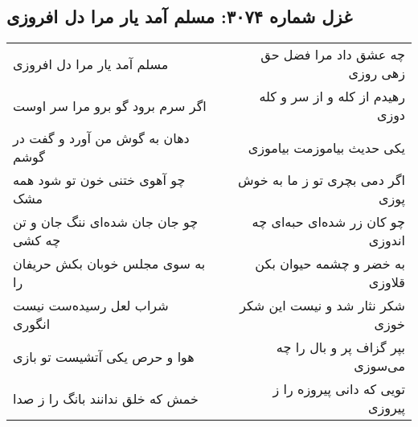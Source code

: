 \begin{center}
\section*{غزل شماره ۳۰۷۴: مسلم آمد یار مرا دل افروزی}
\label{sec:3074}
\begin{longtable}{l p{0.5cm} r}
مسلم آمد یار مرا دل افروزی
&&
چه عشق داد مرا فضل حق زهی روزی
\\
اگر سرم برود گو برو مرا سر اوست
&&
رهیدم از کله و از سر و کله دوزی
\\
دهان به گوش من آورد و گفت در گوشم
&&
یکی حدیث بیاموزمت بیاموزی
\\
چو آهوی ختنی خون تو شود همه مشک
&&
اگر دمی بچری تو ز ما به خوش پوزی
\\
چو جان جان شده‌ای ننگ جان و تن چه کشی
&&
چو کان زر شده‌ای حبه‌ای چه اندوزی
\\
به سوی مجلس خوبان بکش حریفان را
&&
به خضر و چشمه حیوان بکن قلاوزی
\\
شراب لعل رسیده‌ست نیست انگوری
&&
شکر نثار شد و نیست این شکر خوزی
\\
هوا و حرص یکی آتشیست تو بازی
&&
بپر گزاف پر و بال را چه می‌سوزی
\\
خمش که خلق ندانند بانگ را ز صدا
&&
تویی که دانی پیروزه را ز پیروزی
\\
\end{longtable}
\end{center}
